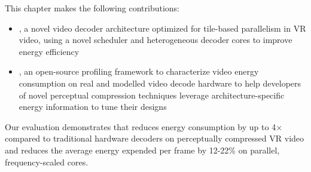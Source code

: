 This chapter makes the following contributions:
\begin{itemize}
    \item \nameArch, a novel video decoder architecture optimized for tile-based parallelism in VR video, using a novel scheduler and heterogeneous decoder cores to improve energy efficiency
    \item \nameArchprof, an open-source profiling framework to characterize video energy consumption on real and modelled video decode hardware to help developers of novel perceptual compression techniques leverage architecture-specific energy information to tune their designs
\end{itemize}

Our evaluation demonstrates that \nameArch reduces energy consumption by up to 4$\times$ compared to traditional hardware decoders on perceptually compressed VR video and reduces the average energy expended per frame by 12-22\% on parallel, frequency-scaled cores.
